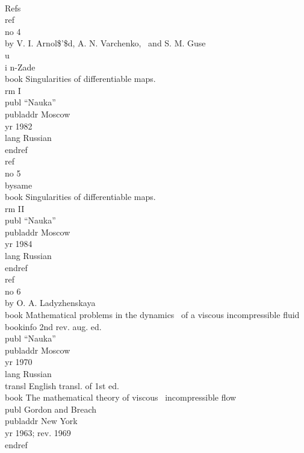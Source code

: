 \pagewidth{23pc}
\beginexample{\exindent=0pt}
\\Refs
\\ref\\no 4
\\by V. I. Arnol\$'\$d, A. N. Varchenko,
\ and S. M. Guse\\u\\i n-Zade
\\book Singularities of differentiable maps.~{\\rm I}
\\publ ``Nauka'' \\publaddr Moscow \\yr 1982
\\lang Russian
\\endref
\ {}
\\ref\\no 5\\bysame 
\\book Singularities of differentiable maps.~{\\rm II}
\\publ ``Nauka'' \\publaddr Moscow \\yr 1984
\\lang Russian
\\endref
\ {}
\\ref\\no 6
\\by O. A. Ladyzhenskaya
\\book Mathematical problems in the dynamics
\ of a viscous incompressible fluid 
\\bookinfo 2nd rev. aug. ed.
\\publ ``Nauka'' \\publaddr Moscow \\yr 1970
\\lang Russian
\\transl English transl. of 1st ed.
\\book The mathematical theory of viscous
\ incompressible flow
\\publ Gordon and Breach \\publaddr New York
\\yr 1963; rev. 1969
\\endref
\endexample

\newpage

